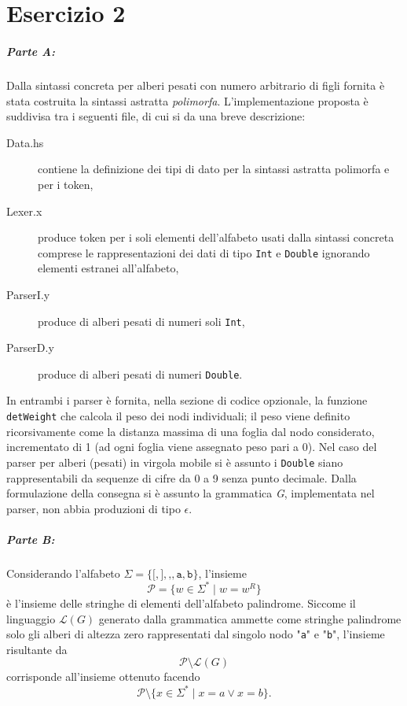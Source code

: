 \documentclass[a4paper, oneside, 11pt]{article}
\begin{document}
\section*{Esercizio 2}
\subparagraph*{Parte A:}
Dalla sintassi concreta per alberi pesati con numero arbitrario di figli fornita \`e stata costruita la sintassi astratta \textit{polimorfa}.
L'implementazione proposta \`e suddivisa tra i seguenti file, di cui si da una breve descrizione:
\begin{description}
	\item[Data.hs] contiene la definizione dei tipi di dato per la sintassi astratta polimorfa  e per i token,
	\item[Lexer.x] produce token per i soli elementi dell'alfabeto usati dalla sintassi concreta comprese le rappresentazioni dei dati di tipo \texttt{Int} e \texttt{Double} ignorando elementi estranei all'alfabeto,
	\item[ParserI.y] produce di alberi pesati di numeri soli \texttt{Int},
	\item[ParserD.y] produce di alberi pesati di numeri \texttt{Double}.
\end{description}	
\par
In entrambi i parser \`e fornita, nella sezione di codice opzionale, la funzione \texttt{detWeight} che calcola il peso dei nodi individuali; il peso viene definito ricorsivamente come la distanza massima di una foglia dal nodo considerato, incrementato di 1 (ad ogni foglia viene assegnato peso pari a 0). 
Nel caso del parser per alberi (pesati) in virgola mobile si \`e assunto i \texttt{Double} siano rappresentabili da sequenze di cifre da 0 a 9 senza punto decimale.
Dalla formulazione della consegna si \`e assunto la grammatica \textit{G}, implementata nel parser, non abbia produzioni di tipo \(\epsilon\).
\subparagraph*{Parte B:}
Considerando l'alfabeto \(\Sigma=\{\texttt{[},\texttt{]},\texttt{,},\texttt{a},\texttt{b}\}\), l'insieme \[\mathcal{P}=\{w \in \Sigma^{\ast}\mid w=w^{R}\}\] \`e l'insieme delle stringhe di elementi dell'alfabeto palindrome. 
Siccome il linguaggio \(\mathcal{L}(G)\) generato dalla grammatica ammette come stringhe palindrome solo gli alberi di altezza zero rappresentati dal singolo nodo "\texttt{a}" e "\texttt{b}", l'insieme risultante da \[\mathcal{P}\setminus\mathcal{L}(G)\] corrisponde all'insieme ottenuto facendo %
\[\mathcal{P}\setminus\{x\in\Sigma^{\ast}\mid x=a \vee x=b\}.\]
\par
\end{document}
